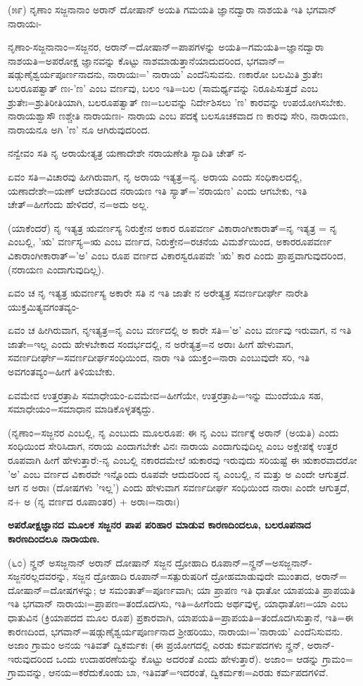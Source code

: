 (೫೯) ನೃಣಾಂ ಸಜ್ಜನಾನಾಂ ಅರಾನ್ ದೋಷಾನ್ ಅಯತಿ ಗಮಯತಿ ಜ್ಞಾನದ್ವಾರಾ ನಾಶಯತಿ ಇತಿ ಭಗವಾನ್ ನಾರಾಯಃ-

ನೃಣಾಂ-ಸಜ್ಜನಾನಾಂ=ಸಜ್ಜನರ, ಅರಾನ್=ದೋಷಾನ್=ಪಾಪಗಳನ್ನು ಅಯತಿ=ಗಮಯತಿ=ಜ್ಞಾನದ್ವಾರಾ ನಾಶಯತಿ=ಅಪರೋಕ್ಷ ಜ್ಞಾನವನ್ನು ಕೊಟ್ಟು ನಾಶಮಾಡುತ್ತಾನೆಯಾದುದರಿಂದ, ಭಗವಾನ್= ಷಡ್ಗುಣೈಶ್ವರ್ಯಪೂರ್ಣನಾದನು, ನಾರಾಯಃ=' ನಾರಾಯ' ಎಂದೆನಿಸುವನು. ಣಕಾರೋ ಬಲಮಿತಿ ಶ್ರುತೇಃ ಬಲರೂಪತ್ವಾತ್ ಣಃ-'ಣ' ಎಂಬ ವರ್ಣವು, ಬಲಂ ಇತಿ=ಬಲ (ಸಾಮರ್ಥ್ಯವನ್ನು ನಿರೂಪಿಸುತ್ತದೆ ಎಂಬ ಶ್ರುತೇಃ=ಶ್ರುತಿರೀತಿಯಾಗಿ, ಬಲರೂಪತ್ವಾತ್ ಣಃ=ಬಲವನ್ನು ನಿರ್ದೇಶಿಸಲು 'ಣ' ಕಾರವನ್ನು ಉಪಯೋಗಿಸಬೇಕು. ನಾರಾಯಶ್ವಾಸೌ ಣಶ್ಚೇತಿ ನಾರಾಯಣಃ- ನಾರಾಯ ಎಂಬ ಪದಕ್ಕೆ ಬಲಸೂಚಕವಾದ ಣ ಕಾರವು ಸೇರಿ, ನಾರಾಯಣ, ನಾರಾಯನೂ ಅಗಿ 'ಣ' ನೂ ಆಗಿರುವುದರಿಂದ.

ನನ್ವೇವಂ ಸತಿ ನೃ ಅರಾಯೇತ್ಯತ್ರ ಯಣಾದೇಶೇ ನರಾಯಣೇತಿ ಸ್ಯಾದಿತಿ ಚೇತ್ ನ-

ಏವಂ ಸತಿ=ವಿಚಾರವು ಹೀಗಿರುವಾಗ, ನೃ ಅರಾಯ ಇತ್ಯತ್ರ=ನೃ. ಅರಾಯ ಎಂದು ಸಂಧಿಕಾಲದಲ್ಲಿ, ಯಣಾದೇಶೇ=ಯಣ್ ಆದೇಶದಿಂದ ನರಾಯಣ ಇತಿ ಸ್ಯಾತ್='ನರಾಯಣ' ಎಂದು ಆಗಬೇಕು, ಇತಿ ಚೇತ್=ಹೀಗೆಂದು ಹೇಳಿದರೆ, ನ=ಅದು ಅಲ್ಲ.

(ಯಾಕೆಂದರೆ) ನೃ ಇತ್ಯತ್ರ ಋವರ್ಣಸ್ಯ ನಿರುಕ್ತೇನ ಅಕಾರ ರೂಪವರ್ಣ ವಿಕಾರಾಂಗೀಕಾರಾತ್=ನೃ ಇತ್ಯತ್ರ = ನೃ ಎಂಬಲ್ಲಿ, 'ಋ' ವರ್ಣಸ್ಯ=ಋ ಎಂಬ ವರ್ಣದ, ನಿರುಕ್ತೇನ=ರಚನೆಯ ವಿಮರ್ಶೆಯಿಂದ, ಅಕಾರರೂಪವರ್ಣ ವಿಕಾರಾಂಗೀಕಾರಾತ್='ಅ' ಎಂಬ ರೂಪ ವರ್ಣದ ವಿಕಾರಸ್ವರೂಪವೇ 'ಋ' ಕಾರ ಎಂದು ಪ್ರಾಪ್ತವಾಗುವುದರಿಂದ, (ನರಾಯಣ ಎಂದಾಗುವುದಿಲ್ಲ).

ಏವಂ ಚ ನೃ ಇತ್ಯತ್ರ ಋವರ್ಣಸ್ಯ ಅಕಾರೇ ಸತಿ ನ ಇತಿ ಜಾತೇ ನ ಅರೇತ್ಯತ್ರ ಸವರ್ಣದೀರ್ಘೇ ನಾರೇತಿ ಯುಕ್ತಮಿತ್ಯವಗಂತವ್ಯಂ-

ಏವಂ ಚ ಹೀಗಿರುವಾಗ, ನೃಇತ್ಯತ್ರ=ನೃ ಎಂಬ ವರ್ಣದಲ್ಲಿ ಅ ಕಾರೇ ಸತಿ='ಅ' ಎಂಬ ವರ್ಣವು ಇರುವಾಗ, ನ ಇತಿ ಜಾತೇ=ಇಲ್ಲ ಎಂದು ಹೇಳಬೇಕಾದ ಸಂದರ್ಭದಲ್ಲಿ, ನ ಅರೇತ್ಯತ್ರ=ನ ಅರಾಃ ಹೀಗೆ ಹೇಳುವಾಗ, ಸವರ್ಣದೀರ್ಘೇ=ಸವರ್ಣದೀರ್ಘಸಂಧಿಯಿಂದ, ನಾರಾ ಇತಿ ಯುಕ್ತಂ=ನಾರಾ ಎಂಬುವುದೇ ಸರಿ, ಇತಿ ಅವಗಂತವ್ಯಂ=ಹೀಗೆ ತಿಳಿಯಬೇಕು.

ಏವಮೇವ ಉತ್ತರತ್ರಾಪಿ ಸಮಾಧೇಯಂ-ಏವಮೇವ=ಹೀಗೆಯೇ, ಉತ್ತರತ್ರಾಪಿ=ಇನ್ನು ಮುಂದೆಯೂ ಸಹ, ಸಮಾಧೇಯಂ=ಸಮಾಧಾನ ಮಾಡಿಕೊಳ್ಳತಕ್ಕದ್ದು.

(ನೃಣಾಂ=ಸಜ್ಜನರ ಎಂಬಲ್ಲಿ, ನೃ ಎಂಬುದು ಮೂಲರೂಪ: ಈ ನೃ ಎಂಬ ವರ್ಣಕ್ಕೆ ಅರಾನ್ (ಅಯತಿ) ಎಂದು ಸಂಧಿಯಿಂದ ಸೇರಿಸಿದಾಗ, ನರಾಯ ಎಂದಾಗಬೇಕೇ ವಿನಃ ನಾರಾಯ ಎಂದಾಗುವುದಿಲ್ಲ ಎಂಬ ಅಕ್ಷೇಪಕ್ಕೆ ಉತ್ತರ ರೂಪವಾಗಿ ಹೀಗೆ ಹೇಳುತ್ತಾರೆ:-ನೃ ಎಂಬಲ್ಲಿ ನಕಾರದಮೇಲೆ ಋಕಾರವು ಇರುವುದು ಸರಿಯಷ್ಟೆ ಈ ಋಕಾರವಾದರೋ 'ಅ' ಎಂಬ ವರ್ಣದ ವಿಕಾರವೇ ಇನ್ನೊಂದು ರೂಪವೇ ಆದುದರಿಂದ ನೃ ಎಂಬಲ್ಲಿ, ನ ಮತ್ತು ಅ ಎಂದೇ ಆಗುತ್ತದೆ. ಆಗ ನ ಅರಾಃ (ದೋಷಗಳು 'ಇಲ್ಲ') ಎಂದು ಹೇಳುವಾಗ ಸವರ್ಣದೀರ್ಘ ಸಂಧಿಯಿಂದ ನಾರಾಃ ಎಂದೇ ಆಗುತ್ತದೆ, ನ+ ಅ (ನೃ ವರ್ಣದ ರೂಪಾಂತರ) + ಅರಾಃ=ನಾರಾಃ)

\begin{center}
\textbf{ಅಪರೋಕ್ಷಜ್ಞಾನದ ಮೂಲಕ ಸಜ್ಜನರ ಪಾಪ ಪರಿಹಾರ ಮಾಡುವ ಕಾರಣದಿಂದಲೂ, ಬಲರೂಪನಾದ ಕಾರಣದಿಂದಲೂ ನಾರಾಯಣ.}
\end{center}

(೬೦) ನೄನ್ ಅಸಜ್ಜನಾನ್ ಅರಾನ್ ದೋಷಾನ್ ಸಜ್ಜನ ದ್ರೋಹಾದಿ ರೂಪಾನ್=ನೄನ್=ಅಸಜ್ಜನಾನ್-ಸಜ್ಜನರಲ್ಲದವರನ್ನು, ಸಜ್ಜನ ದ್ರೋಹಾದಿ ರೂಪಾನ್=ಸತ್ಪುರುಷರಿಗೆ ದ್ರೋಹಮಾಡುವುದೇ ಮುಂತಾದ, ಅರಾನ್= ದೋಷಾನ್=ದೋಷಗಳನ್ನು; ಆ ಸಮಂತಾತ್=ಪೂರ್ಣವಾಗಿ; ಯಾ ಪ್ರಾಪಣ ಇತಿ ಧಾತೋ ಯಾಪಯತಿ ಪ್ರಾಪಯತಿ ಇತಿ ಭಗವಾನ್ ನಾರಾಯಃ=ಪ್ರಾಪಣ=ತಂದೊದಗಿಸು, ಇತಿ=ಹೀಗೆಂದು ಅರ್ಥವುಳ್ಳ, ಯಾಧಾತೋಃ=ಯಾ ಎಂಬ ಧಾತುವಿನ (ಕ್ರಿಯಾಪದದ ಮೂಲ ರೂಪ) ಪ್ರಕಾರವಾಗಿ, ಯಾಪಯತಿ=ಪ್ರಾಪಯತಿ=ತಂದೊದಗಿಸುತ್ತಾನೆ, ಇತಿ=ಈ ಕಾರಣದಿಂದ, ಭಗವಾನ್=ಷಡ್ಗುಣೈಶ್ವರ್ಯಪೂರ್ಣನಾದ ಶ‍್ರೀಹರಿಯು, ನಾರಾಯಃ='ನಾರಾಯ' ಎಂದೆನಿಸುವನು. ಅಜಾಂ ಗ್ರಾಮಂ ಅನಯ ಇತಿವತ್ ದ್ವಿಕರ್ಮಕಃ (ಈ ಪ್ರಯೋಗದಲ್ಲಿ ಎರಡು ಕರ್ಮಪದಗಳು ನೄನ್, ಅರಾನ್-ಇರುವುದರಿಂದ ಒಂದು ಉದಾಹರಣೆಯನ್ನು ಕೊಟ್ಟು ಅದರಂತೆ ಎಂದು ಹೇಳುತ್ತಾರೆ). ಅಜಾಂ= ಆಡನ್ನು ಗ್ರಾಮಂ= ಗ್ರಾಮವನ್ನು, ಆನಯ=ಕರೆದುಕೊಂಡು ಬಾ, ಇತಿವತ್=ಇದರಂತೆ, ದ್ವಿಕರ್ಮಕಃ=ಎರಡು ಕರ್ಮಪದಗಳಿವೆ.

